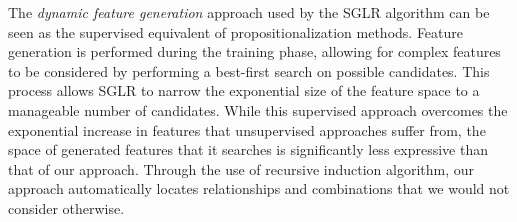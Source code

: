\documentclass[letterpaper]{article} %
\theoremstyle{definition}
\begin{document}


The \emph{dynamic feature generation} approach used by the SGLR algorithm \cite{popescul200716} can be seen as the supervised equivalent of propositionalization methods. Feature generation is performed during the training phase, allowing for complex features to be considered by performing a best-first search on possible candidates.
This process allows SGLR to narrow the exponential size of the feature space to a manageable number of candidates.
While this supervised approach overcomes the exponential increase in features that unsupervised approaches suffer from, the space of generated features that it searches is significantly less expressive than that of our approach.
Through the use of recursive induction algorithm, our approach automatically locates relationships and combinations that we would not consider otherwise.
\end{document}
